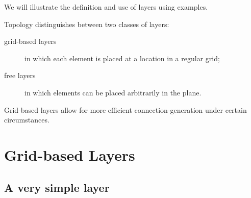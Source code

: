 \documentclass[a4paper,12pt]{report}
\begin{document}
We will illustrate the definition and use of layers using examples.

Topology distinguishes between two classes of layers:
\begin{description}
\item[grid-based layers] in which each element is placed at a location in
  a regular grid;
\item[free layers] in which elements can be placed arbitrarily in the plane.
\end{description}
Grid-based layers allow for more efficient connection-generation under
certain circumstances.

\section{Grid-based Layers}\label{sec:gridbased}

\subsection{A very simple layer}\label{sec:verysimple}
\end{document}

